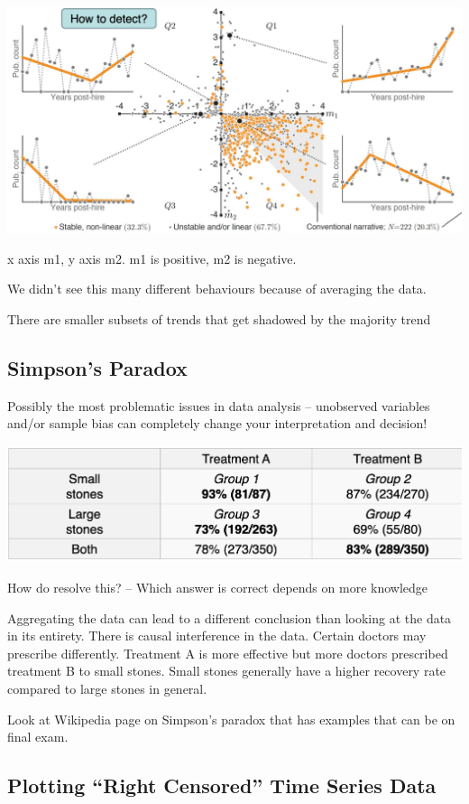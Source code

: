 \documentclass[11pt]{article}
\theoremstyle{definition}
\begin{document}
\includegraphics[width=\textwidth/2]{31.png}

x axis m1, y axis m2.
m1 is positive, m2 is negative.

We didn't see this many different behaviours because of averaging the data.

There are smaller subsets of trends that get shadowed by the majority trend

\subsection{Simpson's Paradox}
Possibly the most problematic issues in data analysis –
unobserved variables and/or sample bias can completely
change your interpretation and decision!

\includegraphics[width=\textwidth]{32.png}

How do resolve this?
– Which answer is correct depends on more knowledge

Aggregating the data can lead to a different conclusion than looking at the data in its entirety.
There is causal interference in the data. Certain doctors
may prescribe differently. Treatment A is more effective but more 
doctors prescribed treatment B to small stones. Small stones 
generally have a higher recovery rate compared to large stones in general.

Look at Wikipedia page on Simpson's paradox that has examples that can be on final exam.

\subsection{Plotting “Right Censored” Time Series Data}
\end{document}
